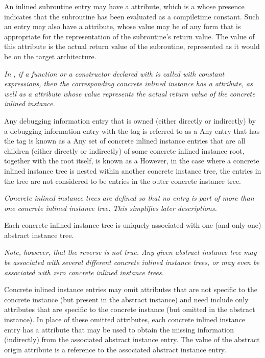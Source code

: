 An inlined subroutine entry may have
a\hypertarget{chap:DWATconstexprcompiletimeconstantfunction}{}
\DWATconstexprDEFN{} attribute,
which is a 
whose presence indicates that the
subroutine has been evaluated as a compile\dash time constant. Such
an entry may also have a \DWATconstvalue{} attribute,
whose value may be of any form that is appropriate for the
representation of the subroutine's return value. The value of
this attribute is the actual return value of the subroutine,
represented as it would be on the target architecture.

\textit{In , if a function or a constructor declared with
is called with constant expressions, then the corresponding
concrete inlined instance has a
\DWATconstexpr{} attribute,
as well as a \DWATconstvalue{} attribute whose value represents
the actual return value of the concrete inlined instance.}

Any debugging information entry that is owned (either
directly or indirectly) by a debugging information entry
with the tag \DWTAGinlinedsubroutine{} is referred to as a
 Any entry that has
the tag
\DWTAGinlinedsubroutine{}
is known as a 
Any set of concrete inlined instance
entries that are all children (either directly or indirectly)
of some concrete inlined instance root, together with the root
itself, is known as a 
However, in the case where a concrete inlined instance tree
is nested within another concrete instance tree, the entries
in the  tree
are not considered to
be entries in the outer concrete instance tree.

\textit{Concrete inlined instance trees are defined so that no entry
is part of more than one concrete inlined instance tree. This
simplifies later descriptions.}

Each concrete inlined instance tree is uniquely associated
with one (and only one) abstract instance tree.

\textit{Note, however, that the reverse is not true. Any given abstract
instance tree may be associated with several different concrete
inlined instance trees, or may even be associated with zero
concrete inlined instance trees.}

Concrete inlined instance entries may omit attributes that
are not specific to the concrete instance (but present in
the abstract instance) and need include only attributes that
are specific to the concrete instance (but omitted in the
abstract instance). In place of these omitted attributes,
each\hypertarget{chap:DWATabstractorigininlineinstance}{}
concrete inlined instance entry has a
\DWATabstractoriginDEFN{}
attribute that may be used to obtain the missing information
(indirectly) from the associated abstract instance entry. The
value of the abstract origin attribute is a reference to the
associated abstract instance entry.

